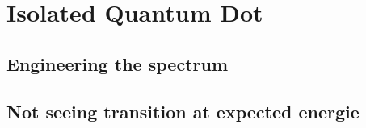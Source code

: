 \section{Isolated Quantum Dot}
\subsection{Engineering the spectrum}
\subsection{Not seeing transition at expected energie}
